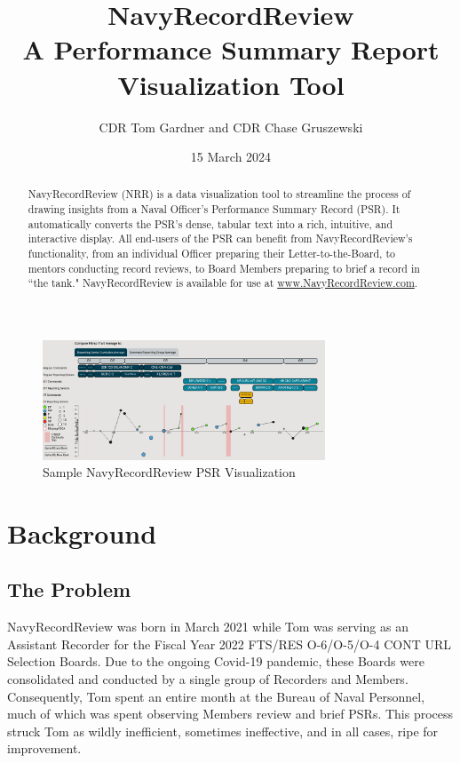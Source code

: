 \documentclass[UTF8]{article}
\begin{document}
\title{
  NavyRecordReview \\
  \large A Performance Summary Report Visualization Tool
}

\author{CDR Tom Gardner and CDR Chase Gruszewski}
\date{15 March 2024}
\maketitle


\begin{abstract}
NavyRecordReview (NRR) is a data visualization tool to streamline the process of
drawing insights from a Naval Officer's Performance Summary Record (PSR). It 
automatically converts the PSR's dense, tabular text into a rich, intuitive, 
and interactive display. All end-users of the PSR can benefit from 
NavyRecordReview's functionality, from an individual Officer preparing their
Letter-to-the-Board, to mentors conducting record reviews, to Board Members 
preparing to brief a record in ``the tank." NavyRecordReview is available for 
use at \href{https://www.navyrecordreview.com}{www.NavyRecordReview.com}.
\end{abstract}

\begin{figure}[h!]
 \centering
 \includegraphics[width=0.75\textwidth]{nrr_dashboard.png}
 \caption{Sample NavyRecordReview PSR Visualization}
\end{figure}


\section{Background}
\subsection{The Problem}
NavyRecordReview was born in March 2021 while Tom was serving as an Assistant
Recorder for the Fiscal Year 2022 FTS/RES O-6/O-5/O-4 CONT URL Selection Boards.
Due to the ongoing Covid-19 pandemic, these Boards were consolidated and
conducted by a single group of Recorders and Members. Consequently, Tom spent an
entire month at the Bureau of Naval Personnel, much of which was spent
observing Members review and brief PSRs. This process struck Tom as wildly
inefficient, sometimes ineffective, and in all cases, ripe for improvement.\\
\end{document}
